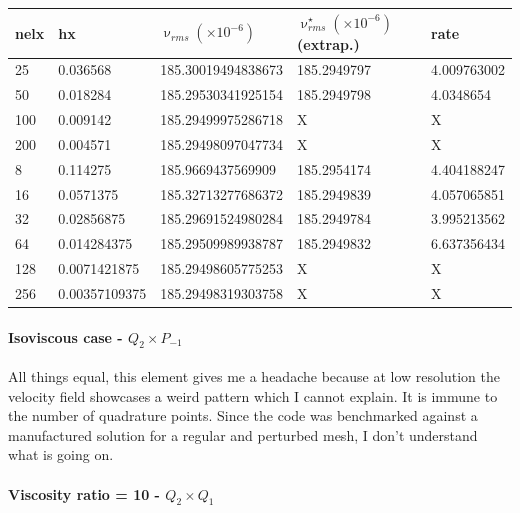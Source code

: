 \begin{tabular}{lllll}
\hline
nelx & hx & $\upnu_{rms}(\times 10^{-6})$ & $\upnu^\star_{rms}(\times 10^{-6})$ (extrap.)  & rate \\
\hline\hline
25   & 0.036568 & 185.30019494838673 & 185.2949797 & 4.009763002 \\
50   & 0.018284 & 185.29530341925154 & 185.2949798 & 4.0348654   \\
100  & 0.009142 & 185.29499975286718 & X & X \\
200  & 0.004571 & 185.29498097047734 & X & X \\
\hline
8    & 0.114275      & 185.9669437569909  &  185.2954174 & 4.404188247 \\
16   & 0.0571375     & 185.32713277686372 &  185.2949839 & 4.057065851 \\
32   & 0.02856875    & 185.29691524980284 &  185.2949784 & 3.995213562 \\
64   & 0.014284375   & 185.29509989938787 &  185.2949832 & 6.637356434 \\
128  & 0.0071421875  & 185.29498605775253 &  X           & X           \\
256  & 0.00357109375 & 185.29498319303758 &  X           & X           \\
\hline
\end{tabular}

\newpage
\paragraph{Isoviscous case - $Q_2\times P_{-1}$}

All things equal, this element gives me a headache because at low resolution the velocity
field showcases a weird pattern which I cannot explain. It is immune to the number of quadrature points. 
Since the code was benchmarked against a manufactured solution for a regular and perturbed 
mesh, I don't understand what is going on.










\newpage
\paragraph{Viscosity ratio = 10 - $Q_2\times Q_1$}

